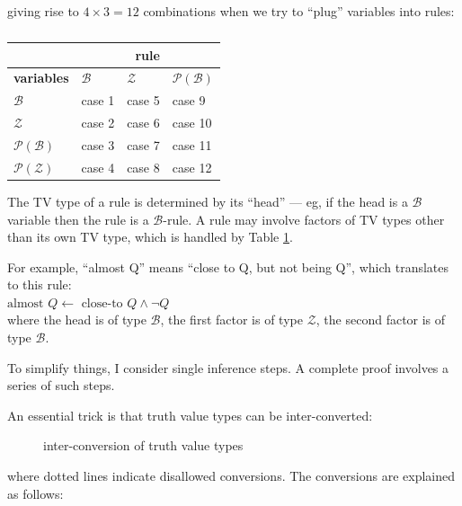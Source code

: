 giving rise to $4 \times 3 = 12$ combinations when we try to ``plug'' variables into rules:

\begin{table}[H]
\parbox{3cm}{\caption{\label{table:TV-rules-combinations}}}
\begin{tabular}{|l||l|l|l|} \hline
                           & \multicolumn{3}{c|}{\textbf{rule}}\\ \hline
\textbf{variables}         & $\mathcal{B}$ & $\mathcal{Z}$ & $\mathcal{P}(\mathcal{B})$ \\ \hline
$\mathcal{B}$              & case 1        & case 5        & case 9  \\
$\mathcal{Z}$              & case 2        & case 6        & case 10 \\
$\mathcal{P}(\mathcal{B})$ & case 3        & case 7        & case 11 \\
$\mathcal{P}(\mathcal{Z})$ & case 4        & case 8        & case 12 \\ \hline
\end{tabular}
\end{table}

The TV type of a rule is determined by its ``head'' --- eg, if the head is a $\mathcal{B}$ variable then the rule is a $\mathcal{B}$-rule.  A rule may involve factors of TV types other than its own TV type, which is handled by Table \ref{table:TV-rules-combinations}.

For example, ``almost Q'' means ``close to Q, but not being Q'', which translates to this rule:\\
\hspace*{1cm} $\mbox{almost } Q \leftarrow \mbox{ close-to } Q \wedge \neg Q$\\
where the head is of type $\mathcal{B}$, the first factor is of type $\mathcal{Z}$, the second factor is of type $\mathcal{B}$.


To simplify things, I consider single inference steps.  A complete proof involves a series of such steps.

An essential trick is that truth value types can be inter-converted:
\begin{figure}[H]
\centering

\caption{inter-conversion of truth value types}
\end{figure}
where dotted lines indicate disallowed conversions.  The conversions are explained as follows:

